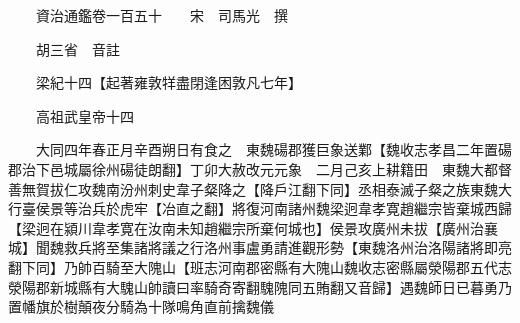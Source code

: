 










 


 
 


 

  
  
  
  
  





  
  
  
  
  
 
  

  

  
  
  



  

 
 

  
   




  

  
  


  　　資治通鑑卷一百五十　　宋　司馬光　撰

　　胡三省　音註

　　梁紀十四【起著雍敦䍧盡閉逢困敦凡七年】

　　高祖武皇帝十四

　　大同四年春正月辛酉朔日有食之　東魏碭郡獲巨象送鄴【魏收志孝昌二年置碭郡治下邑城屬徐州碭徒朗翻】丁卯大赦改元元象　二月己亥上耕籍田　東魏大都督善無賀拔仁攻魏南汾州刺史韋子粲降之【降戶江翻下同】丞相泰滅子粲之族東魏大行臺侯景等治兵於虎牢【冶直之翻】將復河南諸州魏梁迥韋孝寛趙繼宗皆棄城西歸【梁迥在潁川韋孝寛在汝南未知趙繼宗所棄何城也】侯景攻廣州未拔【廣州治襄城】聞魏救兵將至集諸將議之行洛州事盧勇請進觀形勢【東魏洛州治洛陽諸將即亮翻下同】乃帥百騎至大隗山【班志河南郡密縣有大隗山魏收志密縣屬滎陽郡五代志滎陽郡新城縣有大騩山帥讀曰率騎奇寄翻騩隗同五賄翻又音歸】遇魏師日已暮勇乃置幡旗於樹顛夜分騎為十隊鳴角直前擒魏儀


